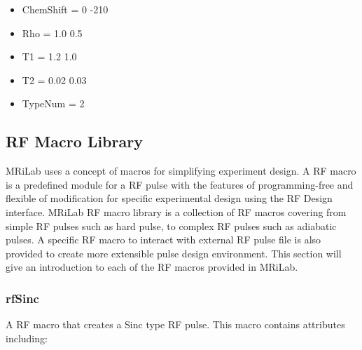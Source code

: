 \documentclass{book}%
\begin{document}
\begin{enumerate}
\begin{itemize}
	\item ChemShift = 0 -210
	\item Rho = 1.0 0.5
	\item T1 = 1.2 1.0
	\item T2 = 0.02 0.03
	\item TypeNum = 2
\end{itemize}

\end{enumerate}

\subsection{RF Macro Library}

MRiLab uses a concept of macros for simplifying experiment design. A RF macro is a predefined module for a RF pulse with the features of programming-free and flexible of modification for specific experimental design using the RF Design interface. MRiLab RF macro library is a collection of RF macros covering from simple RF pulses such as hard pulse, to complex RF pulses such as adiabatic pulses. A specific RF macro to interact with external RF pulse file is also provided to create more extensible pulse design environment. This section will give an introduction to each of the RF macros provided in MRiLab.

\subsubsection{rfSinc}

A RF macro that creates a Sinc type RF pulse. This macro contains attributes including:
\end{document}
